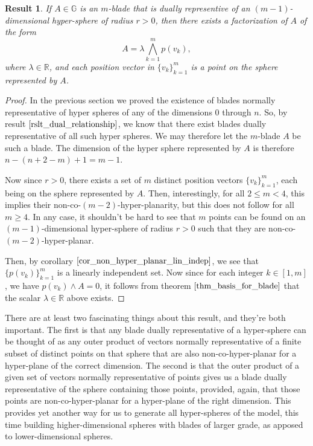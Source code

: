 \documentclass{article}
\newcommand{\R}{\mathbb{R}}
\newcommand{\G}{\mathbb{G}}
\newtheorem{result}{Result}[section]
\begin{document}
\begin{result}\label{rslt_sphere_factorization}
If $A\in\G$ is an $m$-blade that is dually representive of an
$(m-1)$-dimensional hyper-sphere of radius $r>0$, then
there exists a factorization of $A$ of the form
\begin{equation*}
A = \lambda\bigwedge_{k=1}^m p(v_k),
\end{equation*}
where $\lambda\in\R$, and each position vector in $\{v_k\}_{k=1}^m$ is a
point on the sphere represented by $A$.
\end{result}
\begin{proof}
In the previous section
we proved the existence of blades normally representative of hyper spheres
of any of the dimensions 0 through $n$.  So, by result $\eqref{rslt_dual_relationship}$,
we know that there exist blades dually representative of all such hyper spheres.
We may therefore let the $m$-blade $A$ be such a blade.  The dimension of the
hyper sphere represented by $A$ is therefore $n-(n+2-m)+1=m-1$.

Now since $r>0$, there exists a set of $m$ distinct position vectors $\{v_k\}_{k=1}^m$, each being on the
sphere represented by $A$.  Then, interestingly, for all $2\leq m<4$, this implies their
non-co-$(m-2)$-hyper-planarity, but this does not follow for all $m\geq 4$.
In any case, it shouldn't be hard to see that $m$ points can be found on an $(m-1)$-dimensional
hyper-sphere of radius $r>0$ such that they are non-co-$(m-2)$-hyper-planar.

Then, by corollary $\eqref{cor_non_hyper_planar_lin_indep}$,
we see that $\{p(v_k)\}_{k=1}^m$ is a linearly independent set.
Now since for each integer $k\in[1,m]$, we have $p(v_k)\wedge A=0$, it follows from
theorem $\eqref{thm_basis_for_blade}$ that the scalar $\lambda\in\R$ above exists.
\end{proof}

There are at least two fascinating things about this result, and they're both important.
The first is that any
blade dually representative of a hyper-sphere can be thought of as any outer
product of vectors normally representative of a finite subset of distinct points on
that sphere that are also non-co-hyper-planar for a hyper-plane of the correct dimension.
The second is that the outer product of a given set of vectors normally representative of
points gives us a blade dually representative of the sphere containing
those points, provided, again, that those points are non-co-hyper-planar for a hyper-plane
of the right dimension.  This provides yet another way for us to generate all
hyper-spheres of the model, this time building higher-dimensional spheres with
blades of larger grade, as apposed to lower-dimensional spheres.
\end{document}
